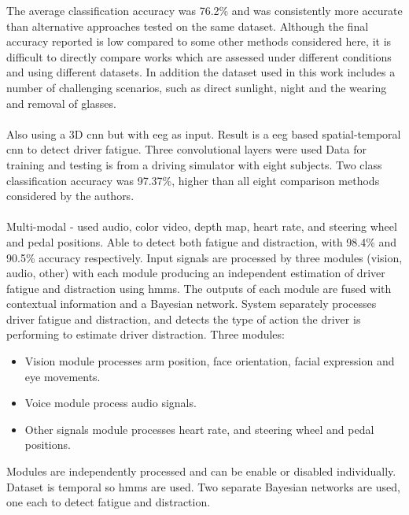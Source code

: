 \documentclass[11pt, parskip=half*,twoside=false]{scrbook}
\begin{document}
The average classification accuracy was 76.2\% and was consistently more accurate than alternative approaches tested on the same dataset. Although the final accuracy reported is low compared to some other methods considered here, it is difficult to directly compare works which are assessed under different conditions and using different datasets. In addition the dataset used in this work includes a number of challenging scenarios, such as direct sunlight, night and the wearing and removal of glasses.

\paragraph{\citet{trutschelPERCLOSAlertnessMeasure2011}}

\paragraph{\citet{gaoEEGBasedSpatioTemporal2019}} Also using a 3D \gls{cnn} but with \gls{eeg} as input. Result is a \gls{eeg} based spatial-temporal \gls{cnn} to detect driver fatigue. Three convolutional layers were used Data for training and testing is from a driving simulator with eight subjects. Two class classification accuracy was 97.37\%, higher than all eight comparison methods considered by the authors.

\paragraph{\citet{crayeMultiModalDriverFatigue2016}} Multi-modal - used audio, color video, depth map, heart rate, and steering wheel and pedal positions. Able to detect both fatigue and distraction, with 98.4\% and 90.5\% accuracy respectively. Input signals are processed by three modules (vision, audio, other) with each module producing an independent estimation of driver fatigue and distraction using \glspl{hmm}. The outputs of each module are fused with contextual information and a Bayesian network. System separately processes driver fatigue and distraction, and detects the type of action the driver is performing to estimate driver distraction.  Three modules: 
\begin{itemize}
	\item Vision module processes arm position, face orientation, facial expression and eye movements.
	\item Voice module process audio signals.
	\item Other signals module processes heart rate, and steering wheel and pedal positions.
\end{itemize}
Modules are independently processed and can be enable or disabled individually. Dataset is temporal so \glspl{hmm} are used. Two separate Bayesian networks are used, one each to detect fatigue and distraction.
\end{document}
